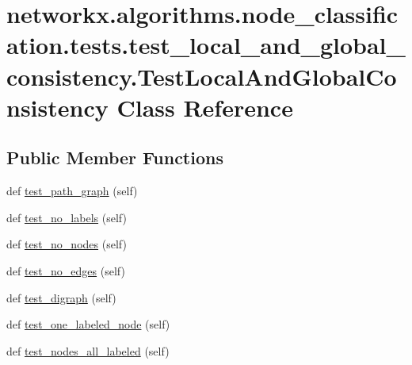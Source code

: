 \hypertarget{classnetworkx_1_1algorithms_1_1node__classification_1_1tests_1_1test__local__and__global__consisb7079825a7c9941d86ebc12e4a07c2a9}{}\section{networkx.\+algorithms.\+node\+\_\+classification.\+tests.\+test\+\_\+local\+\_\+and\+\_\+global\+\_\+consistency.\+Test\+Local\+And\+Global\+Consistency Class Reference}
\label{classnetworkx_1_1algorithms_1_1node__classification_1_1tests_1_1test__local__and__global__consisb7079825a7c9941d86ebc12e4a07c2a9}
\subsection*{Public Member Functions}
\begin{DoxyCompactItemize}
\item 
def \hyperlink{classnetworkx_1_1algorithms_1_1node__classification_1_1tests_1_1test__local__and__global__consisb7079825a7c9941d86ebc12e4a07c2a9_a03078bdb21f69201fe7aae308d17f6da}{test\+\_\+path\+\_\+graph} (self)
\item 
def \hyperlink{classnetworkx_1_1algorithms_1_1node__classification_1_1tests_1_1test__local__and__global__consisb7079825a7c9941d86ebc12e4a07c2a9_a5328d007500341cc15ff4186aea38f93}{test\+\_\+no\+\_\+labels} (self)
\item 
def \hyperlink{classnetworkx_1_1algorithms_1_1node__classification_1_1tests_1_1test__local__and__global__consisb7079825a7c9941d86ebc12e4a07c2a9_ac73de3b8d0b3678ceb0ca7abba7c306b}{test\+\_\+no\+\_\+nodes} (self)
\item 
def \hyperlink{classnetworkx_1_1algorithms_1_1node__classification_1_1tests_1_1test__local__and__global__consisb7079825a7c9941d86ebc12e4a07c2a9_a11b2cbe7de29d3f86b932714f6dd8a7c}{test\+\_\+no\+\_\+edges} (self)
\item 
def \hyperlink{classnetworkx_1_1algorithms_1_1node__classification_1_1tests_1_1test__local__and__global__consisb7079825a7c9941d86ebc12e4a07c2a9_aa43d067732eebf9a0fb1f1ebe649c399}{test\+\_\+digraph} (self)
\item 
def \hyperlink{classnetworkx_1_1algorithms_1_1node__classification_1_1tests_1_1test__local__and__global__consisb7079825a7c9941d86ebc12e4a07c2a9_aa0b9024f229498f479eba02cf9175af4}{test\+\_\+one\+\_\+labeled\+\_\+node} (self)
\item 
def \hyperlink{classnetworkx_1_1algorithms_1_1node__classification_1_1tests_1_1test__local__and__global__consisb7079825a7c9941d86ebc12e4a07c2a9_a750c75ae8c28fe6239a5e84043bd8e48}{test\+\_\+nodes\+\_\+all\+\_\+labeled} (self)
\end{DoxyCompactItemize}


